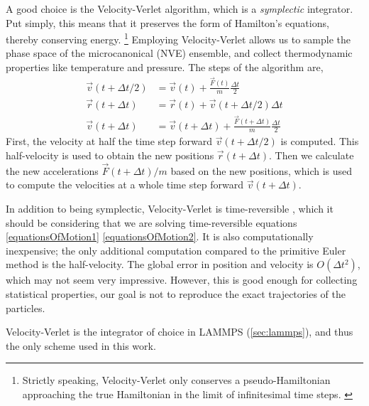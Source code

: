 \documentclass[twoside,english]{uiofysmaster}
\begin{document}
A good choice is the Velocity-Verlet algorithm, which is
a \textit{symplectic} integrator. Put simply, this means that it preserves the form of Hamilton's equations, thereby
conserving energy. \footnote{Strictly speaking, Velocity-Verlet only conserves a pseudo-Hamiltonian
approaching the true Hamiltonian in the limit of infinitesimal time steps. \cite{Frenkel01}}
Employing Velocity-Verlet
allows us to sample the phase space of the microcanonical (NVE) ensemble, and collect 
thermodynamic properties like temperature and pressure.
The steps of the algorithm are,
\begin{align}
 \vec{v}(t + \Delta t/2) &= \vec{v}(t) + \frac{\vec{F}(t)}{m}\frac{\Delta t}{2} \\
 \vec{r}(t + \Delta t) &= \vec{r}(t) + \vec{v}(t + \Delta t/2)\Delta t \\
 \vec{v}(t + \Delta t) &= \vec{v}(t + \Delta t) + \frac{\vec{F}(t + \Delta t)}{m}\frac{\Delta t}{2}
\end{align}
First, the velocity at half the time step forward $\vec{v}(t + \Delta t/2)$ is computed. 
This half-velocity is used to obtain the new positions $\vec{r}(t + \Delta t)$. 
Then we calculate the new accelerations $\vec{F}(t+\Delta t)/m$ based on the new positions, which is used
to compute the velocities at a whole time step forward $\vec{v}(t + \Delta t)$. 

In addition to being symplectic, Velocity-Verlet is time-reversible \cite{Frenkel01}, which it should be considering that we 
are solving time-reversible equations \eqref{equationsOfMotion1} \eqref{equationsOfMotion2}. 
It is also computationally inexpensive; the only 
additional computation compared to the primitive Euler method is the half-velocity. 
The global error in position and velocity is $O(\Delta t^2)$, which may not seem very impressive. However, 
this is good enough for collecting statistical properties, 
our goal is not to reproduce the exact trajectories of the particles. 

Velocity-Verlet is the integrator of choice in LAMMPS (\autoref{sec:lammps}), and thus the 
only scheme used in this work. 
\end{document}
